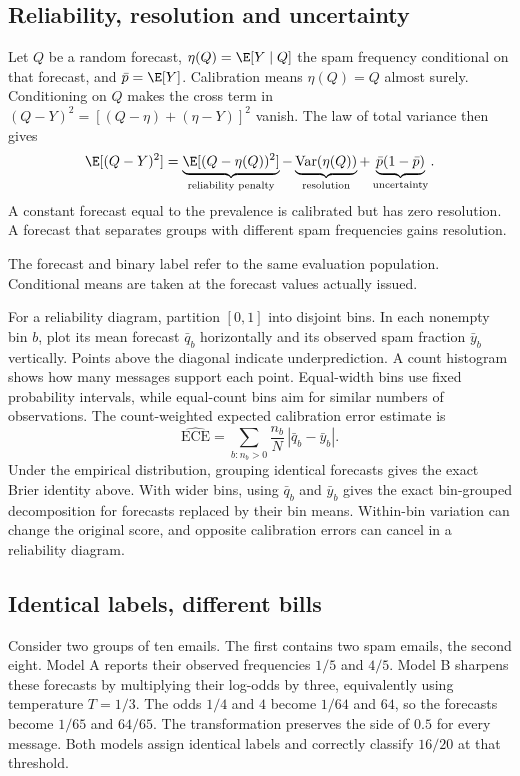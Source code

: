 \subsection{Reliability, resolution and uncertainty}
Let $Q$ be a random forecast, $\eta(Q)=\E[Y\mid Q]$ the spam frequency conditional on that
forecast, and $\bar p=\E[Y]$. Calibration means $\eta(Q)=Q$ almost surely. Conditioning
on $Q$ makes the cross term in $(Q-Y)^2=[(Q-\eta)+(\eta-Y)]^2$ vanish.
The law of total variance then gives
\[
 \E[(Q-Y)^2]=
 \underbrace{\E[(Q-\eta(Q))^2]}_{\text{reliability penalty}}
 -\underbrace{\mathrm{Var}(\eta(Q))}_{\text{resolution}}
 +\underbrace{\bar p(1-\bar p)}_{\text{uncertainty}} .
\]
A constant forecast equal to the prevalence is calibrated but has zero resolution.
A forecast that separates groups with different spam frequencies gains resolution.
\begin{assumptions}The forecast and binary label refer to the same evaluation population.
Conditional means are taken at the forecast values actually issued.\end{assumptions}

For a reliability diagram, partition $[0,1]$ into disjoint bins. In each nonempty bin $b$,
plot its mean forecast $\bar q_b$ horizontally and its observed spam fraction $\bar y_b$
vertically. Points above the diagonal indicate underprediction. A count histogram shows how
many messages support each point. Equal-width bins use fixed probability intervals, while
equal-count bins aim for similar numbers of observations. The count-weighted expected
calibration error estimate is
\[
 \widehat{\mathrm{ECE}}=\sum_{b:n_b>0}\frac{n_b}{N}\,|\bar q_b-\bar y_b| .
\]
Under the empirical distribution, grouping identical forecasts gives the exact Brier identity
above. With wider bins, using $\bar q_b$ and $\bar y_b$ gives the exact bin-grouped decomposition
for forecasts replaced by their bin means. Within-bin variation can change the original
score, and opposite calibration errors can cancel in a reliability diagram.

\subsection{Identical labels, different bills}
Consider two groups of ten emails. The first contains two spam emails, the second eight.
Model A reports their observed frequencies $1/5$ and $4/5$. Model B sharpens these forecasts
by multiplying their log-odds by three, equivalently using temperature $T=1/3$.
The odds $1/4$ and $4$ become $1/64$ and $64$, so the forecasts become $1/65$ and $64/65$.
The transformation preserves the side of $0.5$ for every message. Both models assign
identical labels and correctly classify $16/20$ at that threshold.

